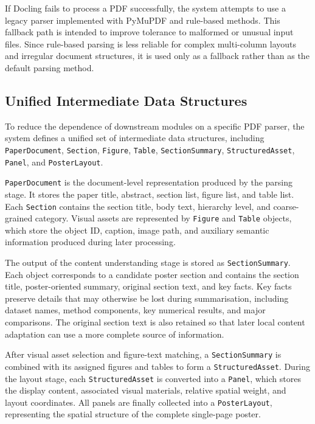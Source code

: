 \documentclass[12pt,oneside]{report}
\begin{document}
\vspace{1em}

If Docling fails to process a PDF successfully, the system attempts to use a legacy parser implemented with PyMuPDF and rule-based methods. This fallback path is intended to improve tolerance to malformed or unusual input files. Since rule-based parsing is less reliable for complex multi-column layouts and irregular document structures, it is used only as a fallback rather than as the default parsing method.

\subsection{Unified Intermediate Data Structures}

To reduce the dependence of downstream modules on a specific PDF parser, the system defines a unified set of intermediate data structures, including \texttt{PaperDocument}, \texttt{Section}, \texttt{Figure}, \texttt{Table}, \texttt{SectionSummary}, \texttt{StructuredAsset}, \texttt{Panel}, and \texttt{PosterLayout}.

\vspace{1em}

\texttt{PaperDocument} is the document-level representation produced by the parsing stage. It stores the paper title, abstract, section list, figure list, and table list. Each \texttt{Section} contains the section title, body text, hierarchy level, and coarse-grained category. Visual assets are represented by \texttt{Figure} and \texttt{Table} objects, which store the object ID, caption, image path, and auxiliary semantic information produced during later processing.

\vspace{1em}

The output of the content understanding stage is stored as \texttt{SectionSummary}. Each object corresponds to a candidate poster section and contains the section title, poster-oriented summary, original section text, and key facts. Key facts preserve details that may otherwise be lost during summarisation, including dataset names, method components, key numerical results, and major comparisons. The original section text is also retained so that later local content adaptation can use a more complete source of information.

\vspace{1em}

After visual asset selection and figure-text matching, a \texttt{SectionSummary} is combined with its assigned figures and tables to form a \texttt{StructuredAsset}. During the layout stage, each \texttt{StructuredAsset} is converted into a \texttt{Panel}, which stores the display content, associated visual materials, relative spatial weight, and layout coordinates. All panels are finally collected into a \texttt{PosterLayout}, representing the spatial structure of the complete single-page poster.
\end{document}
